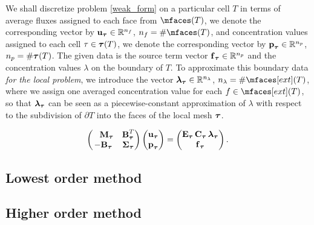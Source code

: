         We shall discretize problem \eqref{weak_form} on a particular cell $T$ in terms of average fluxes assigned to each face from $\mfaces(T)$,
        we denote the corresponding vector by ${\vect u}_\mmesh\in\mathbb{R}^{n_f}$, $n_f=\#\mfaces(T)$,  and concentration values assigned to each cell ${\tau \in \mmesh(T)}$, we denote the corresponding vector by ${\vect p}_\mmesh\in\mathbb{R}^{n_p}$, $n_p=\#\mmesh(T)$. The given data is the source term vector ${\vect f}_\mmesh\in \mathbb{R}^{n_p}$ and the concentration values $\lambda$ on the boundary of $T$.
	To approximate this boundary data \emph{for the local problem}, we introduce the vector
	${\vect \lambda}_\mmesh\in\mathbb{R}^{n_\lambda}$, $n_\lambda=\#\mfaces[ext](T)$,
	where we assign one averaged concentration value for each $f\in\mfaces[ext](T)$, so that ${\vect \lambda}_\mmesh$ can be seen as a piecewise-constant approximation of $\lambda$ with respect to the subdivision of $\partial T$ into the faces of the local mesh $\mmesh$.
	


\begin{equation}\label{local}
	\begin{pmatrix}
		\phantom{-}\vect M_\mmesh & \vect B^T_\mmesh \\
		-\vect B_\mmesh & \vect \Sigma_\mmesh
	\end{pmatrix}
	\begin{pmatrix} {\vect u}_\mmesh \\ {\vect p}_\mmesh \end{pmatrix}
	=
	\begin{pmatrix} \vect E_\mmesh\,\vect C_\mmesh\,{\vect \lambda}_\mmesh \\ {\vect f}_\mmesh \end{pmatrix}.
\end{equation}

\subsection{Lowest order method}

\subsection{Higher order method} 

